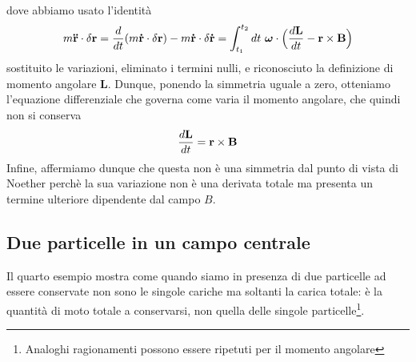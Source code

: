 \begin{example}
\begin{equation*}
\begin{aligned}
    \end{aligned}
    \end{equation*} 
        dove abbiamo usato l'identità
    \begin{equation*}
        m \mathbf{\ddot r} \cdot \delta \mathbf r = \frac{d}{dt} (m \mathbf{\dot r} \cdot \delta \mathbf r) - m \mathbf{\dot r} \cdot \delta \mathbf{\dot r} = \int_{t_1}^{t_2}dt~ \boldsymbol \omega \cdot \Big( \frac{d\mathbf L}{dt} - \mathbf r \times \mathbf B \Big)
    \end{equation*}
        sostituito le variazioni, eliminato i termini nulli, e riconosciuto la definizione di momento angolare $\mathbf L$. Dunque, ponendo la simmetria uguale a zero, otteniamo l'equazione differenziale che governa come varia il momento angolare, che quindi non si conserva 
    \begin{equation*}
        \frac{d\mathbf L}{dt} = \mathbf r \times \mathbf B 
    \end{equation*}
        Infine, affermiamo dunque che questa non è una simmetria dal punto di vista di Noether perchè la sua variazione non è una derivata totale ma presenta un termine ulteriore dipendente dal campo $B$.
    \end{example}

\subsection{Due particelle in un campo centrale}

    Il quarto esempio mostra come quando siamo in presenza di due particelle ad essere conservate non sono le singole cariche ma soltanti la carica totale: è la quantità di moto totale a conservarsi, non quella delle singole particelle\footnote{Analoghi ragionamenti possono essere ripetuti per il momento angolare}. 

